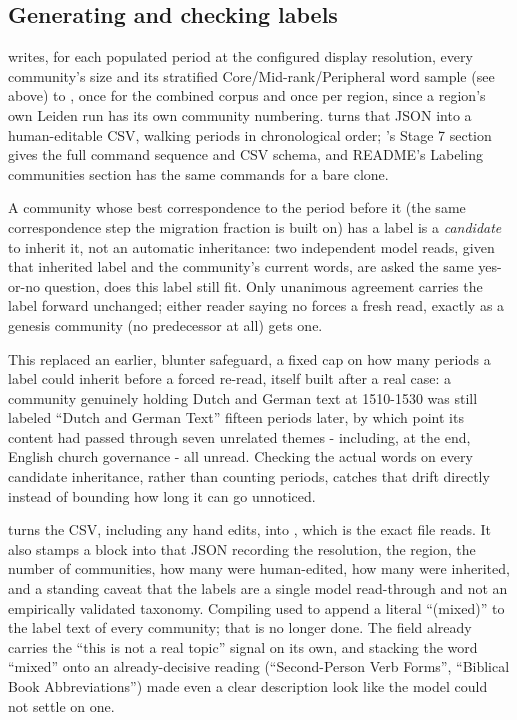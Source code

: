 \documentclass[11pt]{article}
\begin{document}
\subsection{Generating and checking labels}

 writes, for each populated period at
the configured display resolution, every community's size and its
stratified Core/Mid-rank/Peripheral word sample (see above) to
, once for
the combined corpus and once per region, since a region's own Leiden run
has its own community numbering. 
turns that JSON into a human-editable CSV, walking periods in
chronological order; 's Stage 7 section
gives the full command sequence and CSV schema, and README's Labeling
communities section has the same commands for a bare clone.

A community whose best correspondence to the period before it (the same
correspondence step the migration fraction is built on) has a label is
a \emph{candidate} to inherit it, not an automatic inheritance: two
independent model reads, given that inherited label and the community's
current words, are asked the same yes-or-no question, does this label
still fit. Only unanimous agreement carries the label forward
unchanged; either reader saying no forces a fresh read, exactly as a
genesis community (no predecessor at all) gets one.

This replaced an
earlier, blunter safeguard, a fixed cap on how many periods a label
could inherit before a forced re-read, itself built after a real case:
a community genuinely holding Dutch and German text at 1510-1530 was
still labeled ``Dutch and German Text'' fifteen periods later, by which
point its content had passed through seven unrelated themes -
including, at the end, English church governance - all unread. Checking
the actual words on every candidate inheritance, rather than counting
periods, catches that drift directly instead of bounding how long it
can go unnoticed.

 turns the CSV, including any hand edits, into
, which is
the exact file  reads. It also stamps a
 block into that JSON recording the resolution, the region,
the number of communities, how many were human-edited, how many were
inherited, and a standing caveat that the labels are a single model
read-through and not an empirically validated taxonomy. Compiling used
to append a literal ``(mixed)'' to the label text of every
 community; that is no longer done. The
 field already carries the ``this is not a real topic''
signal on its own, and stacking the word ``mixed'' onto an
already-decisive reading (``Second-Person Verb Forms'', ``Biblical Book
Abbreviations'') made even a clear description look like the model
could not settle on one.
\end{document}
